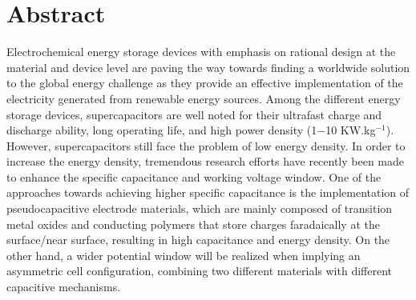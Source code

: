 \documentclass[reprint,amsmath,amssymb,aps,floatfix,
]{revtex4-2}
\begin{document}
\section*{\label{sec:level1}A\lowercase{bstract}}
Electrochemical energy storage devices with emphasis on rational design at the material and device level are paving the way towards finding a worldwide solution to the global energy challenge as they provide an effective implementation of the electricity generated from renewable energy sources. Among the different energy storage devices, supercapacitors are well noted for their ultrafast charge and discharge ability, long operating life, and high power density (1$-$10 KW.kg$^{-1}$). However, supercapacitors still face the problem of low energy density. In order to increase the energy density, tremendous research efforts have recently been made to enhance the specific capacitance and working voltage window. One of the approaches towards achieving higher specific capacitance is the implementation of pseudocapacitive electrode materials, which are mainly composed of transition metal oxides and conducting polymers that store charges faradaically at the surface/near surface, resulting in high capacitance and energy density. On the  other hand, a wider potential window will be realized when implying an asymmetric cell configuration, combining two different materials with different capacitive mechanisms.
\end{document}
